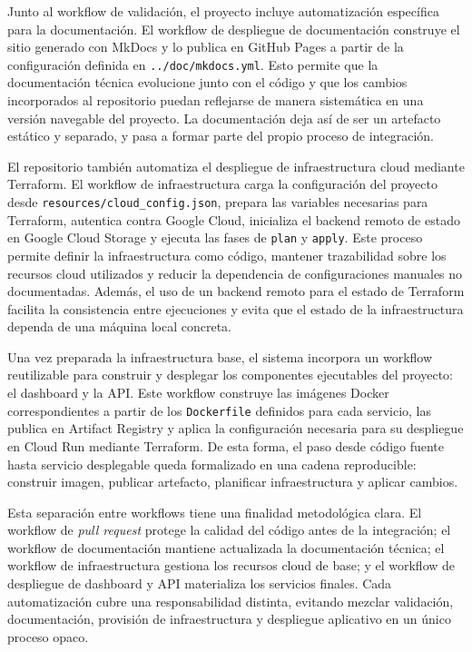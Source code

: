 Junto al workflow de validación, el proyecto incluye automatización específica para la documentación. El workflow de despliegue de documentación construye el sitio generado con MkDocs y lo publica en GitHub Pages a partir de la configuración definida en \texttt{../doc/mkdocs.yml}. Esto permite que la documentación técnica evolucione junto con el código y que los cambios incorporados al repositorio puedan reflejarse de manera sistemática en una versión navegable del proyecto. La documentación deja así de ser un artefacto estático y separado, y pasa a formar parte del propio proceso de integración.

El repositorio también automatiza el despliegue de infraestructura cloud mediante Terraform. El workflow de infraestructura carga la configuración del proyecto desde \texttt{resources/cloud\_config.json}, prepara las variables necesarias para Terraform, autentica contra Google Cloud, inicializa el backend remoto de estado en Google Cloud Storage y ejecuta las fases de \texttt{plan} y \texttt{apply}. Este proceso permite definir la infraestructura como código, mantener trazabilidad sobre los recursos cloud utilizados y reducir la dependencia de configuraciones manuales no documentadas. Además, el uso de un backend remoto para el estado de Terraform facilita la consistencia entre ejecuciones y evita que el estado de la infraestructura dependa de una máquina local concreta.

Una vez preparada la infraestructura base, el sistema incorpora un workflow reutilizable para construir y desplegar los componentes ejecutables del proyecto: el dashboard y la API. Este workflow construye las imágenes Docker correspondientes a partir de los \texttt{Dockerfile} definidos para cada servicio, las publica en Artifact Registry y aplica la configuración necesaria para su despliegue en Cloud Run mediante Terraform. De esta forma, el paso desde código fuente hasta servicio desplegable queda formalizado en una cadena reproducible: construir imagen, publicar artefacto, planificar infraestructura y aplicar cambios.

Esta separación entre workflows tiene una finalidad metodológica clara. El workflow de \emph{pull request} protege la calidad del código antes de la integración; el workflow de documentación mantiene actualizada la documentación técnica; el workflow de infraestructura gestiona los recursos cloud de base; y el workflow de despliegue de dashboard y API materializa los servicios finales. Cada automatización cubre una responsabilidad distinta, evitando mezclar validación, documentación, provisión de infraestructura y despliegue aplicativo en un único proceso opaco.

